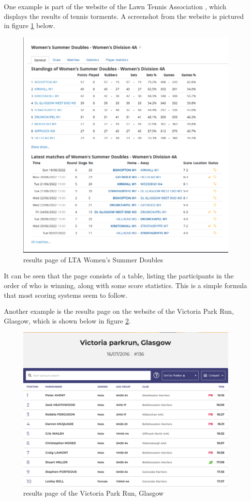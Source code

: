 \documentclass{l4proj}
\begin{document}
One example is part of the website of the Lawn Tennis Association \citep{Tennis}, which displays the results of tennis torments. A screenshot from the website is pictured in figure \ref{fig:Tennis} below.

\begin{figure}[H]
    \centering
    \includegraphics[width=0.6\linewidth]{images/Tennis systme.png} 

    \caption{results page of LTA Women's Summer Doubles \citep{Tennis}
    }

    \label{fig:Tennis} 
\end{figure}

It can be seen that the page consists of a table, listing the participants in the order of who is winning, along with some score statistics. This is a simple formula that most scoring systems seem to follow.

Another example is the results page on the website of the Victoria Park Run, Glasgow, which is shown below in figure \ref{fig:parkrun}.

\begin{figure}[h!]
    \centering
    \includegraphics[width=0.6\linewidth]{images/ParkRun.png} 

    \caption{results page of the Victoria Park Run, Glasgow \citep{Parkrun}
    }

    \label{fig:parkrun} 
\end{figure}
\end{document}
